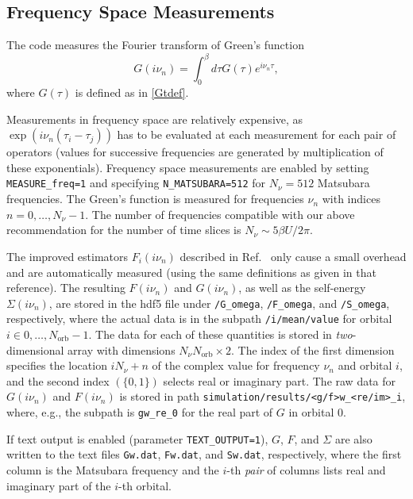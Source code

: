 \documentclass[aps,prb,floatfix,superscriptaddress,twocolumn,notitlepage]{revtex4-1}
\newcommand{\iom}{{\ensuremath{i\nu}}}
\begin{document}
\subsection{Frequency Space Measurements}

The code measures the Fourier transform of Green's function 
\begin{equation}
G(\iom_{n}) = \int_{0}^{\beta} d\tau G(\tau) e^{\iom_{n}\tau},
\end{equation}
where $G(\tau)$ is defined as in \eqref{Gtdef}.

Measurements in frequency space are relatively expensive, as $\exp(\iom_{n} (\tau_i-\tau_j))$ has to be evaluated at each measurement for each pair of operators (values for successive frequencies are generated by multiplication of these exponentials). Frequency space measurements are enabled by setting \verb#MEASURE_freq=1# and specifying \verb#N_MATSUBARA=512# for $N_{\nu}=512$ Matsubara frequencies. The Green's function is measured for frequencies $\nu_{n}$ with indices $n=0,\ldots,N_{\nu}-1$. The number of frequencies compatible with our above recommendation for the number of time slices is $N_{\nu}\sim 5\beta U/2\pi$.

The improved estimators $F_{i}(\iom_n)$ described in Ref.~ only cause a small overhead and are automatically measured (using the same definitions as given in that reference). The resulting $F(\iom_n)$ and $G(\iom_n)$, as well as the self-energy $\Sigma(\iom_n)$, are stored in the hdf5 file under \verb#/G_omega#, \verb#/F_omega#, and \verb#/S_omega#, respectively, where the actual data is in the subpath \verb#/i/mean/value# for orbital $i \in 0,\ldots,N_{\text{orb}}-1$. The data for each of these quantities is stored in \emph{two}-dimensional array with dimensions $N_{\nu}N_{\text{orb}}\times 2$. The index of the first dimension specifies the location $i N_{\nu}+n$ of the complex value for frequency $\nu_{n}$ and orbital $i$, and the second index $(\{0,1\})$ selects real or imaginary part.
The raw data for $G(\iom_{n})$ and $F(\iom_{n})$ is stored in path \verb#simulation/results/<g/f>w_<re/im>_i#, where, e.g., the subpath is \verb#gw_re_0# for the real part of $G$ in orbital $0$.

If text output is enabled (parameter \verb#TEXT_OUTPUT=1#), $G$, $F$, and $\Sigma$ are also written to the text files \verb#Gw.dat#, \verb#Fw.dat#, and \verb#Sw.dat#, respectively, where the first column is the Matsubara frequency and the $i$-th \emph{pair} of columns lists real and imaginary part of the $i$-th orbital.
\end{document}
